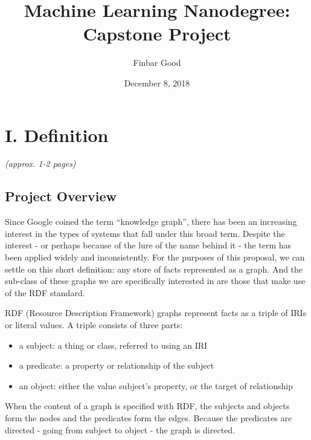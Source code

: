 \documentclass[12pt]{article}
\begin{document}
\title{Machine Learning Nanodegree: Capstone Project}
\author{Finbar Good}
\date{December 8, 2018}

\maketitle
   
\setlength{\parindent}{0cm}
\setlength{\parskip}{0.5\baselineskip}

\section{I. Definition}\label{i.-definition}

\emph{(approx. 1-2 pages)}

\subsection{Project Overview}\label{project-overview}
Since Google coined the term ``knowledge graph'', there has been an
increasing interest in the types of systems that fall under this broad
term\cite{ehrlinger2016towards}. Despite the interest - or perhaps
because of the lure of the name behind it - the term has been applied
widely and inconsistently. For the purposes of this proposal, we can
settle on this short definition: any store of facts represented as a
graph. And the sub-class of these graphs we are specifically interested
in are those that make use of the RDF standard.

RDF (Resource Description Framework) graphs \cite{w3RDF} represent facts
as a triple of IRIs or literal values. A triple consists of three parts:

\begin{itemize}
\item a subject: a thing or class, referred to using an IRI
\item a predicate: a property or relationship of the subject
\item an object: either the value subject's property, or the target of
  relationship
\end{itemize}

When the content of a graph is specified with RDF, the subjects and
objects form the nodes and the predicates form the edges. Because the
predicates are directed - going from subject to object - the graph is
directed.
\end{document}
